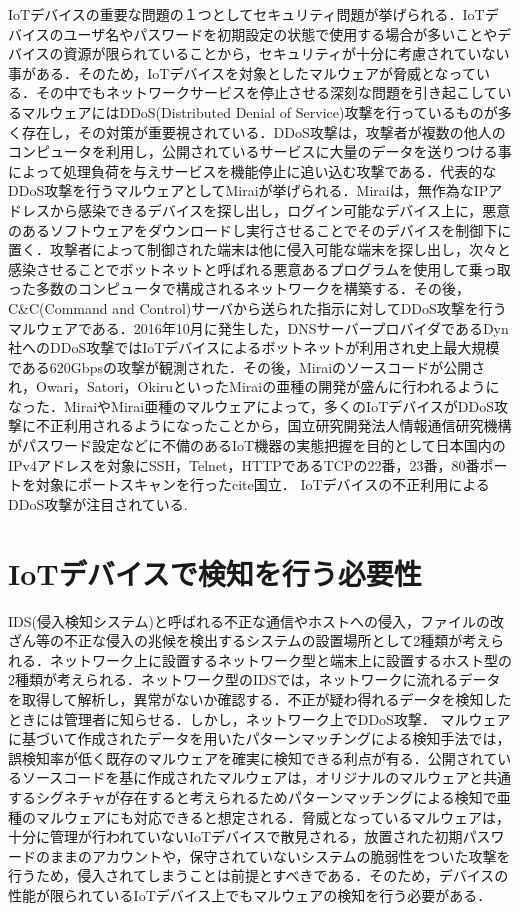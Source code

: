 IoTデバイスの重要な問題の１つとしてセキュリティ問題が挙げられる．IoTデバイスのユーザ名やパスワードを初期設定の状態で使用する場合が多いことやデバイスの資源が限られていることから，セキュリティが十分に考慮されていない事がある．そのため，IoTデバイスを対象としたマルウェアが脅威となっている．その中でもネットワークサービスを停止させる深刻な問題を引き起こしているマルウェアにはDDoS(Distributed Denial of Service)攻撃を行っているものが多く存在し，その対策が重要視されている．DDoS攻撃は，攻撃者が複数の他人のコンピュータを利用し，公開されているサービスに大量のデータを送りつける事によって処理負荷を与えサービスを機能停止に追い込む攻撃である．代表的なDDoS攻撃を行うマルウェアとしてMiraiが挙げられる．Mirai\cite{Mirai}は，無作為なIPアドレスから感染できるデバイスを探し出し，ログイン可能なデバイス上に，悪意のあるソフトウェアをダウンロードし実行させることでそのデバイスを制御下に置く．攻撃者によって制御された端末は他に侵入可能な端末を探し出し，次々と感染させることでボットネットと呼ばれる悪意あるプログラムを使用して乗っ取った多数のコンピュータで構成されるネットワークを構築する．その後，C\&C(Command and Control)サーバから送られた指示に対してDDoS攻撃を行うマルウェアである．2016年10月に発生した，DNSサーバープロバイダであるDyn社へのDDoS攻撃ではIoTデバイスによるボットネットが利用され史上最大規模である620Gbpsの攻撃が観測された\cite{Dyn}．その後，Miraiのソースコードが公開され，Owari，Satori，OkiruといったMiraiの亜種の開発が盛んに行われるようになった．MiraiやMirai亜種のマルウェアによって，多くのIoTデバイスがDDoS攻撃に不正利用されるようになったことから，国立研究開発法人情報通信研究機構がパスワード設定などに不備のあるIoT機器の実態把握を目的として日本国内のIPv4アドレスを対象にSSH，Telnet，HTTPであるTCPの22番，23番，80番ポートを対象にポートスキャンを行ったcite{国立}．
IoTデバイスの不正利用によるDDoS攻撃が注目されている.

\section{IoTデバイスで検知を行う必要性}

IDS(侵入検知システム)と呼ばれる不正な通信やホストへの侵入，ファイルの改ざん等の不正な侵入の兆候を検出するシステムの設置場所として2種類が考えられる．ネットワーク上に設置するネットワーク型と端末上に設置するホスト型の2種類が考えられる．ネットワーク型のIDSでは，ネットワークに流れるデータを取得して解析し，異常がないか確認する．不正が疑わ得れるデータを検知したときには管理者に知らせる．しかし，ネットワーク上でDDoS攻撃．
マルウェアに基づいて作成されたデータを用いたパターンマッチングによる検知手法では，誤検知率が低く既存のマルウェアを確実に検知できる利点が有る．公開されているソースコードを基に作成されたマルウェアは，オリジナルのマルウェアと共通するシグネチャが存在すると考えられるためパターンマッチングによる検知で亜種のマルウェアにも対応できると想定される．脅威となっているマルウェアは，十分に管理が行われていないIoTデバイスで散見される，放置された初期パスワードのままのアカウントや，保守されていないシステムの脆弱性をついた攻撃を行うため，侵入されてしまうことは前提とすべきである．そのため，デバイスの性能が限られているIoTデバイス上でもマルウェアの検知を行う必要がある．

